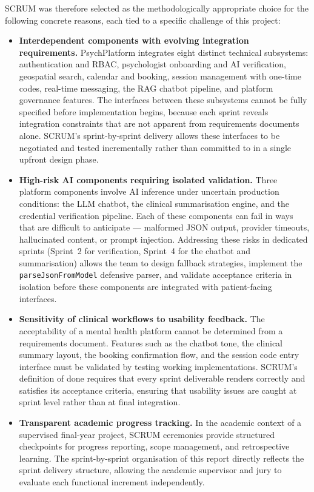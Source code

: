 \documentclass[a4paper,12pt]{report}
\begin{document}
SCRUM was therefore selected as the methodologically appropriate choice for the following concrete reasons, each tied to a specific challenge of this project:

\begin{itemize}[leftmargin=1.5cm, itemsep=6pt]
  \item[--] \textbf{Interdependent components with evolving integration requirements.} PsychPlatform integrates eight distinct technical subsystems: authentication and RBAC, psychologist onboarding and AI verification, geospatial search, calendar and booking, session management with one-time codes, real-time messaging, the RAG chatbot pipeline, and platform governance features. The interfaces between these subsystems cannot be fully specified before implementation begins, because each sprint reveals integration constraints that are not apparent from requirements documents alone. SCRUM's sprint-by-sprint delivery allows these interfaces to be negotiated and tested incrementally rather than committed to in a single upfront design phase.

  \item[--] \textbf{High-risk AI components requiring isolated validation.} Three platform components involve AI inference under uncertain production conditions: the LLM chatbot, the clinical summarisation engine, and the credential verification pipeline. Each of these components can fail in ways that are difficult to anticipate --- malformed JSON output, provider timeouts, hallucinated content, or prompt injection. Addressing these risks in dedicated sprints (Sprint~2 for verification, Sprint~4 for the chatbot and summarisation) allows the team to design fallback strategies, implement the \texttt{parseJsonFromModel} defensive parser, and validate acceptance criteria in isolation before these components are integrated with patient-facing interfaces.

  \item[--] \textbf{Sensitivity of clinical workflows to usability feedback.} The acceptability of a mental health platform cannot be determined from a requirements document. Features such as the chatbot tone, the clinical summary layout, the booking confirmation flow, and the session code entry interface must be validated by testing working implementations. SCRUM's definition of done requires that every sprint deliverable renders correctly and satisfies its acceptance criteria, ensuring that usability issues are caught at sprint level rather than at final integration.

  \item[--] \textbf{Transparent academic progress tracking.} In the academic context of a supervised final-year project, SCRUM ceremonies provide structured checkpoints for progress reporting, scope management, and retrospective learning. The sprint-by-sprint organisation of this report directly reflects the sprint delivery structure, allowing the academic supervisor and jury to evaluate each functional increment independently.
\end{itemize}
\end{document}
